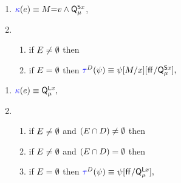 \begin{enumerate}[topsep=0pt,label=(\textsc{w}\arabic*),ref=\textsc{w}\arabic*]
  \setcounter{enumi}{\value{Bkappa}}
\item \label{write-kappa-q}
  \begin{math}
    {\color{blue}\kappa}(e) \mathrel{\equiv}
    M{=}v
    \land
    \smash{\mathsf{Q}_{\mu}^{\mathsf{S}x}}
  \end{math},    
\item[] 
  \begin{enumerate}[leftmargin=0pt]
  \item \label{write-tau-nonempty-q}
    if $E\neq\emptyset$ then 
    \makebox[0cm][l]{%
      \begin{math}
        \aTr{\bEvs}{\bForm} \riff 
        \bForm
        [\aExp/\aLoc][(\aExp{=}\aVal\land\QS{\aLoc}{\amode})/\QS{\aLoc}{\amode}],
      \end{math}}
  \item \label{write-tau-empty-q}
    if $E=\emptyset$ then 
    \begin{math}
      \aTr{\bEvs}{\bForm} \riff 
      \bForm
      [\aExp/\aLoc][\FALSE/\QS{\aLoc}{\amode}],
    \end{math}
  \end{enumerate}
\end{enumerate}
\begin{enumerate}[topsep=0pt,label=(\textsc{r}\arabic*),ref=\textsc{r}\arabic*]
  \setcounter{enumi}{\value{Bkappa}}
\item \label{read-kappa-q}
  \begin{math}
    {\color{blue}\kappa}(e) \mathrel{\equiv} \smash{\mathsf{Q}_{\mu}^{\mathsf{L}x}},
  \end{math}
\item[] 
  \begin{enumerate}[leftmargin=0pt]
  \item \label{read-tau-dep-q}
    if $E\neq\emptyset$ and $(E\cap D)\neq\emptyset$ then
    \makebox[0pt][l]{\begin{math}
        \aTr{\bEvs}{\bForm} \riff
        \aVal{=}\aReg
        \limplies \bForm,
      \end{math}}
  \item \label{read-tau-ind-q}
    if $E\neq\emptyset$ and $(E\cap D)=\emptyset$ then
    \makebox[0pt][l]{\begin{math}
        \aTr{\bEvs}{\bForm} \riff
        \PBR{\aVal{=}\aReg \lor \aLoc{=}\aReg}
        \limplies \bForm [\FALSE/\QL{\aLoc}{\amode}],
      \end{math}}
  \item \label{read-tau-empty-q}
    if $E=\emptyset$ then
    \begin{math}
      \aTr{\bEvs}{\bForm} \riff
      \bForm [\FALSE/\QL{\aLoc}{\amode}],
    \end{math}
  \end{enumerate}
\end{enumerate}    
